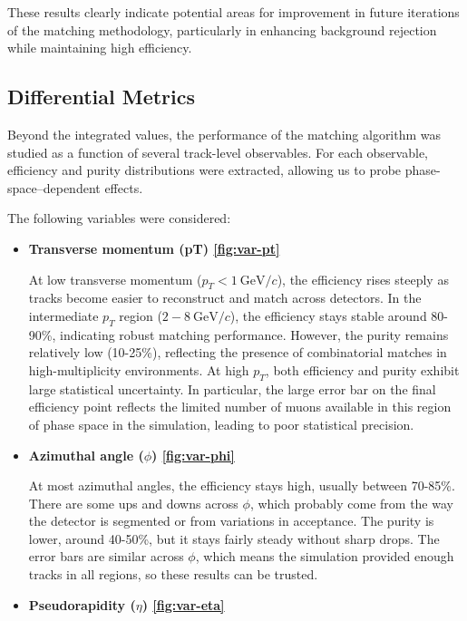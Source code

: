 \documentclass{article}
\begin{document}
These results clearly indicate potential areas for improvement in future iterations of the matching methodology, particularly in enhancing background rejection while maintaining high efficiency.

\subsection{Differential Metrics}

Beyond the integrated values, the performance of the matching algorithm was studied as a function of several track-level observables. For each observable, efficiency and purity distributions were extracted, allowing us to probe phase-space--dependent effects.

The following variables were considered:

\begin{itemize}
    \item \textbf{Transverse momentum (pT) \cref{fig:var-pt}}
    
    At low transverse momentum ($p_T < 1\ \text{GeV}/c$), the efficiency rises steeply as tracks become easier to reconstruct and match across 
    detectors. In the intermediate $p_T$ region ($2-8\ \text{GeV}/c$), the efficiency stays stable around 80-90\%, indicating robust matching performance.
    However, the purity remains relatively low (10-25\%), reflecting the presence of combinatorial matches in high-multiplicity environments. 
    At high $p_T$, both efficiency and purity exhibit large statistical uncertainty. In particular, the large error bar on the final efficiency 
    point reflects the limited number of muons available in this region of phase space in the simulation, leading to poor statistical precision.

    \item \textbf{Azimuthal angle ($\phi$) \cref{fig:var-phi}}
    
    At most azimuthal angles, the efficiency stays high, usually between 70-85\%. There are some ups and downs across $\phi$, 
    which probably come from the way the detector is segmented or from variations in acceptance. The purity is lower, around 40-50\%, 
    but it stays fairly steady without sharp drops. The error bars are similar across $\phi$, which means the simulation provided enough tracks in 
    all regions, so these results can be trusted.

    \item \textbf{Pseudorapidity ($\eta$) \cref{fig:var-eta}}
    

\end{itemize}
\end{document}
